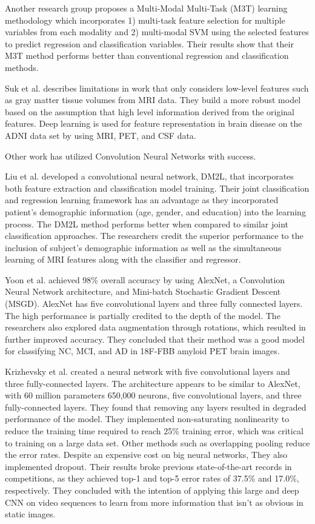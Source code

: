 \documentclass[10pt,twocolumn]{article}
\begin{document}
Another research group \cite{zhang2012multi} proposes a Multi-Modal Multi-Task (M3T) learning methodology which incorporates 1) multi-task feature selection for multiple variables from each modality and 2) multi-modal SVM using the selected features to predict regression and classification variables. Their results show that their M3T method performs better than conventional regression and classification methods. 

Suk et al.\cite{suk2013deep} describes limitations in work that only considers low-level features such as gray matter tissue volumes from MRI data. They build a more robust model based on the assumption that high level information derived from the original features. Deep learning is used for feature representation in brain disease on the ADNI data set by using MRI, PET, and CSF data.

Other work has utilized Convolution Neural Networks with success. 

Liu et al. \cite{liu2018joint} developed a convolutional neural network, DM2L, that incorporates both feature extraction and classification model training. Their joint classification and regression learning framework has an advantage as they incorporated patient's demographic information (age, gender, and education) into the learning process. The DM2L method performs better when compared to similar joint classification approaches. The researchers credit the superior performance to the inclusion of subject's demographic information as well as the simultaneous learning of MRI features along with the classifier and regressor.

Yoon et al.  \cite{yoon2018classification} achieved 98\% overall accuracy by using AlexNet, a Convolution Neural Network architecture, and Mini-batch Stochastic Gradient Descent (MSGD). AlexNet has five convolutional layers and three fully connected layers. The high performance is partially credited to the depth of the model. The researchers also explored data augmentation through rotations, which resulted in further improved accuracy. They concluded that their method was a good model for classifying NC, MCI, and AD in 18F-FBB amyloid PET brain images. 

Krizhevsky et al.\cite{krizhevsky2012imagenet} 
created a neural network with five convolutional layers and three fully-connected layers. The architecture appears to be similar to AlexNet, with 60 million parameters 650,000 neurons, five convolutional layers, and three fully-connected layers. They found that removing any layers resulted in degraded performance of the model. They implemented non-saturating nonlinearity to reduce the training time required to reach 25\% training error, which was critical to training on a large data set. Other methods such as overlapping pooling reduce the error rates. Despite an expensive cost on big neural networks, They also implemented dropout. Their results broke previous state-of-the-art records in competitions, as they achieved top-1 and top-5 error rates of 37.5\% and 17.0\%, respectively. They concluded with the intention of applying this large and deep CNN on video sequences to learn from more information that isn't as obvious in static images. 
\end{document}
